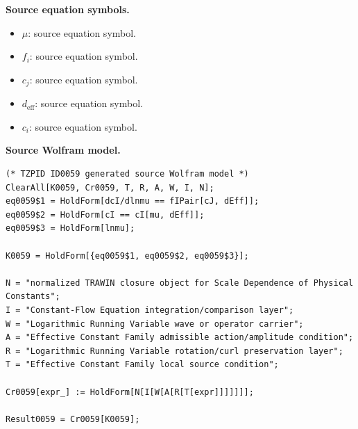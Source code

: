 \begin{minipage}[t]{0.49\linewidth}
\begingroup
\small
\raggedright
\textbf{Source equation symbols.}\par
\begin{itemize}[leftmargin=1.35em,itemsep=1pt,topsep=1pt,parsep=0pt]
    \item $\mu$: source equation symbol.
    \item $f_{i}$: source equation symbol.
    \item $c_{j}$: source equation symbol.
    \item $d_{\mathrm{eff}}$: source equation symbol.
    \item $c_{i}$: source equation symbol.
\end{itemize}
\endgroup
\end{minipage}\hfill
\begin{minipage}[t]{0.47\linewidth}
\begingroup
\scriptsize
\raggedright
\textbf{Source Wolfram model.}\par
\begin{Verbatim}[fontsize=\tiny,breaklines=true,breakanywhere=true]
(* TZPID ID0059 generated source Wolfram model *)
ClearAll[K0059, Cr0059, T, R, A, W, I, N];
eq0059$1 = HoldForm[dcI/dlnmu == fIPair[cJ, dEff]];
eq0059$2 = HoldForm[cI == cI[mu, dEff]];
eq0059$3 = HoldForm[lnmu];

K0059 = HoldForm[{eq0059$1, eq0059$2, eq0059$3}];

N = "normalized TRAWIN closure object for Scale Dependence of Physical Constants";
I = "Constant-Flow Equation integration/comparison layer";
W = "Logarithmic Running Variable wave or operator carrier";
A = "Effective Constant Family admissible action/amplitude condition";
R = "Logarithmic Running Variable rotation/curl preservation layer";
T = "Effective Constant Family local source condition";

Cr0059[expr_] := HoldForm[N[I[W[A[R[T[expr]]]]]]];

Result0059 = Cr0059[K0059];
\end{Verbatim}
\endgroup
\end{minipage}

